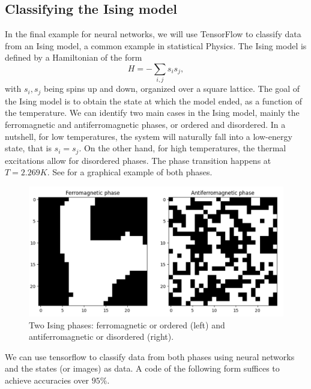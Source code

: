 \documentclass[]{report}
\begin{document}
\subsection{Classifying the Ising model}\label{sec.ising}

In the final example for neural networks, we will use TensorFlow to classify data from an Ising model, a common example in statistical Physics. The Ising model is defined by a Hamiltonian of the form
\begin{equation}
H = -\sum_{i, j} s_i s_j, 
\end{equation}
with $s_i, s_j$ being spins up and down, organized over a square lattice. The goal of the Ising model is to obtain the state at which the model ended, as a function of the temperature. We can identify two main cases in the Ising model, mainly the ferromagnetic and antiferromagnetic phases, or ordered and disordered. In a nutshell, for low temperatures, the system will naturally fall into a low-energy state, that is $s_i = s_j$. On the other hand, for high temperatures, the thermal excitations allow for disordered phases. The phase transition happens at $T = 2.269 K$. See  for a graphical example of both phases. 

\begin{figure}\centering
\includegraphics[width = .8\linewidth]{images/ising}
\caption{Two Ising phases: ferromagnetic or ordered (left) and antiferromagnetic or disordered (right). }
\end{figure}

We can use tensorflow to classify data from both phases using neural networks and the states (or images) as data. A code of the following form suffices to achieve accuracies over $95\%$.



\vskip5mm
\end{document}
